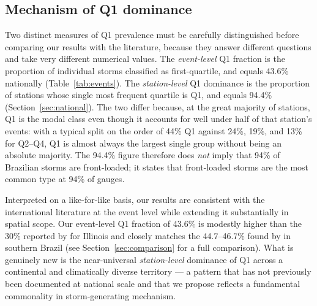 \documentclass[a4paper,fleqn]{cas-sc}
\begin{document}
\subsection{Mechanism of Q1 dominance}
\label{sec:mechanism}

Two distinct measures of Q1 prevalence must be carefully distinguished
before comparing our results with the literature, because they answer
different questions and take very different numerical values. The
\emph{event-level} Q1 fraction is the proportion of individual storms
classified as first-quartile, and equals 43.6\% nationally
(Table~\ref{tab:events}). The \emph{station-level} Q1 dominance is the
proportion of stations whose single most frequent quartile is Q1, and
equals 94.4\% (Section~\ref{sec:national}). The two differ because, at
the great majority of stations, Q1 is the modal class even though it
accounts for well under half of that station's events: with a typical
split on the order of 44\% Q1 against 24\%, 19\%, and 13\% for Q2–Q4,
Q1 is almost always the largest single group without being an absolute
majority. The 94.4\% figure therefore does \emph{not} imply that 94\%
of Brazilian storms are front-loaded; it states that front-loaded
storms are the most common type at 94\% of gauges.

Interpreted on a like-for-like basis, our results are consistent with
the international literature at the event level while extending it
substantially in spatial scope. Our event-level Q1 fraction of 43.6\%
is modestly higher than the 30\% reported by \citet{Huff1967} for
Illinois and closely matches the 44.7–46.7\% found by
\citet{SantaCatarina2021} in southern Brazil (see
Section~\ref{sec:comparison} for a full comparison). What is genuinely
new is the near-universal \emph{station-level} dominance of Q1 across a
continental and climatically diverse territory — a pattern that has not
previously been documented at national scale and that we propose
reflects a fundamental commonality in storm-generating mechanism.
\end{document}
